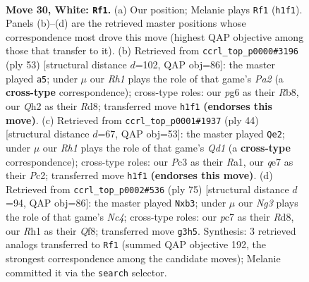 \documentclass[11pt]{article}
\begin{document}
\begin{figure}[p]\centering
\begin{subfigure}{0.46\textwidth}\centering
\resizebox{\linewidth}{!}{%
\newchessgame
\chessboard[
  setfen={rn2r1k1/2pnq2p/1p2p1p1/p3Pp2/P2P1P1P/1RP2NN1/6PQ/3K3R w - - 1 30},
  showmover=false,
  pgfstyle=straightmove, color=movearrow, markmove={h1-f1}
]}
\caption{}
\end{subfigure}\hfill
\begin{subfigure}{0.46\textwidth}\centering
\resizebox{\linewidth}{!}{%
\newchessgame
\chessboard[
  setfen={1r1r4/p2qn1k1/4np2/1p1p2p1/1PpP3p/P1N1PN1P/2Q2PP1/4RK1R b - - 1 27},
  showmover=false,
  pgfstyle=straightmove, color=movearrow, markmove={a7-a5}
]}
\caption{}
\end{subfigure}
\\[4pt]
\begin{subfigure}{0.46\textwidth}\centering
\resizebox{\linewidth}{!}{%
\newchessgame
\chessboard[
  setfen={3q1r2/1r4pk/R2ppnnp/1pp1p3/4P3/3PPN1P/1PP2NP1/R2Q2K1 w - - 10 23},
  showmover=false,
  pgfstyle=straightmove, color=movearrow, markmove={d1-e2}
]}
\caption{}
\end{subfigure}\hfill
\begin{subfigure}{0.46\textwidth}\centering
\resizebox{\linewidth}{!}{%
\newchessgame
\chessboard[
  setfen={3r1qk1/2r2p2/ppnpp1p1/2n4p/P1P1PP2/1PN1R1PN/3R2KP/3Q4 b - - 6 38},
  showmover=false,
  pgfstyle=straightmove, color=movearrow, markmove={c5-b3}
]}
\caption{}
\end{subfigure}
\caption{\textbf{Move 30, White: \texttt{Rf1}.} (a) Our position; Melanie plays \texttt{Rf1} (\texttt{h1f1}). Panels (b)--(d) are the retrieved master positions whose correspondence most drove this move (highest QAP objective among those that transfer to it). (b) Retrieved from \texttt{ccrl\_top\_p0000\#3196} (ply 53) [structural distance $d$=102, QAP obj=86]: the master played \texttt{a5}; under $\mu$ our \emph{Rh1} plays the role of that game's \emph{Pa2} (a \textbf{cross-type} correspondence); cross-type roles: our \emph{p}g6 as their \emph{R}b8, our \emph{Q}h2 as their \emph{R}d8; transferred move \texttt{h1f1} \textbf{(endorses this move)}. (c) Retrieved from \texttt{ccrl\_top\_p0001\#1937} (ply 44) [structural distance $d$=67, QAP obj=53]: the master played \texttt{Qe2}; under $\mu$ our \emph{Rh1} plays the role of that game's \emph{Qd1} (a \textbf{cross-type} correspondence); cross-type roles: our \emph{P}c3 as their \emph{R}a1, our \emph{q}e7 as their \emph{P}c2; transferred move \texttt{h1f1} \textbf{(endorses this move)}. (d) Retrieved from \texttt{ccrl\_top\_p0002\#536} (ply 75) [structural distance $d$=94, QAP obj=86]: the master played \texttt{Nxb3}; under $\mu$ our \emph{Ng3} plays the role of that game's \emph{Nc4}; cross-type roles: our \emph{p}c7 as their \emph{R}d8, our \emph{R}h1 as their \emph{Q}f8; transferred move \texttt{g3h5}. Synthesis: 3 retrieved analogs transferred to \texttt{Rf1} (summed QAP objective 192, the strongest correspondence among the candidate moves); Melanie committed it via the \texttt{search} selector.}
\label{fig:thought-m58}
\end{figure}
\end{document}
